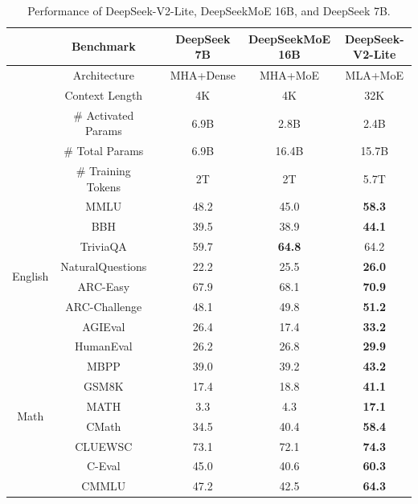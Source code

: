 \documentclass[11pt, a4paper, logo, copyright, nonumbering]{deepseek}
\newcommand{\dsviilite}{DeepSeek-V2-Lite}
\begin{document}
\begin{CJK*}{UTF8}{gbsn}
\begin{table}[!ht]
    \centering
    \setlength{\tabcolsep}{4pt}
    \begin{tabular}{@{}c c l c c c@{}}
    \toprule
    & \textbf{Benchmark} & & \textbf{DeepSeek 7B} & \textbf{DeepSeekMoE 16B} & \textbf{DeepSeek-V2-Lite} \\
    \midrule
    & Architecture &  & MHA+Dense & MHA+MoE & MLA+MoE \\
    & Context Length & & 4K & 4K & 32K \\
    & \# Activated Params &  & 6.9B & 2.8B & 2.4B \\
    & \# Total Params &  & 6.9B & 16.4B & 15.7B \\
    & \# Training Tokens  &  & 2T & 2T & 5.7T \\
    \midrule
    \multirow{8}{*}{English} 
    & MMLU & & 48.2 & 45.0 & \textbf{58.3} \\
    & BBH & & 39.5 & 38.9 & \textbf{44.1} \\
    & TriviaQA & & 59.7 & \textbf{64.8} & 64.2 \\
    & NaturalQuestions & & 22.2 & 25.5 & \textbf{26.0} \\
    & ARC-Easy & & 67.9 & 68.1  & \textbf{70.9} \\
    & ARC-Challenge & & 48.1 &  49.8 & \textbf{51.2} \\
    & AGIEval & & 26.4 & 17.4 & \textbf{33.2} \\
    \midrule
    \multirow{3}{*}{Code} & HumanEval & & 26.2 & 26.8 & \textbf{29.9} \\
    & MBPP & & 39.0 & 39.2 & \textbf{43.2} \\
    \midrule
    \multirow{4}{*}{Math} & GSM8K & & 17.4 &  18.8 & \textbf{41.1} \\
    & MATH & & 3.3 & 4.3 & \textbf{17.1} \\
    & CMath & & 34.5 & 40.4 & \textbf{58.4} \\
    \midrule
    \multirow{3}{*}{Chinese} & CLUEWSC & & 73.1 &  72.1 & \textbf{74.3} \\
    & C-Eval & & 45.0 &  40.6 & \textbf{60.3} \\
    & CMMLU & & 47.2 &  42.5 & \textbf{64.3} \\
    \bottomrule
    \end{tabular}
    \caption{
    Performance of \dsviilite{}, DeepSeekMoE 16B, and DeepSeek 7B. 
    }
    \label{tab:dsviilite_base}
\end{table}


\end{CJK*}
\end{document}

